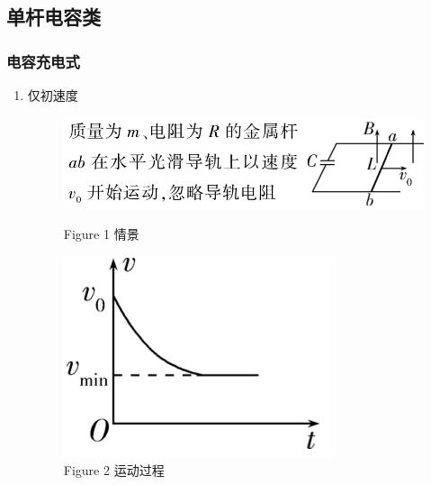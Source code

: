 \documentclass{article}
\begin{document}
\vspace{2em}

\subsection{单杆电容类}
\subsubsection{电容充电式}
\begin{enumerate}[label = (\arabic*{})]
    \item 仅初速度

          \begin{figure}[h]
              \begin{minipage}{0.65\textwidth}
                  \centering
                  \includegraphics[width = \textwidth]{pictures/11.png}
                  \caption*{Figure 1 情景}
              \end{minipage}
              \hfill
              \begin{minipage}{0.3\textwidth}
                  \centering
                  \includegraphics[width = \textwidth]{pictures/12.png}
                  \caption*{Figure 2 运动过程}
              \end{minipage}
          \end{figure}


\end{enumerate}
\end{document}
